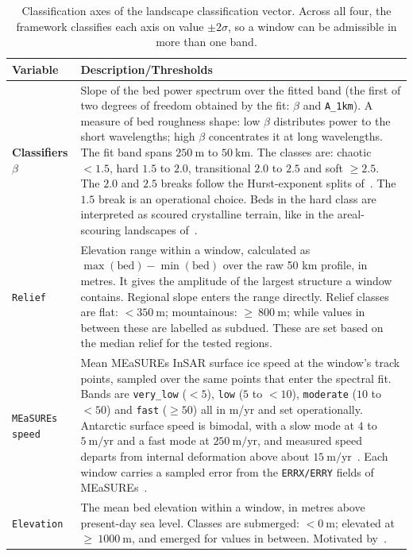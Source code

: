 \begin{table}[H]
\centering
\caption{Classification axes of the landscape classification vector. Across all four, the framework classifies each axis on value $\pm2\sigma$, so a window can be admissible in more than one band.}
\label{tab:axes}
\begin{tabularx}{\textwidth}{p{4.0cm} X}
\toprule
\textbf{Variable} & \textbf{Description/Thresholds} \\
\midrule
\textbf{Classifiers} 
  $\beta$ & Slope of the bed power spectrum over the fitted band (the first of two degrees of freedom obtained by the fit: $\beta$ and \texttt{A\_1km}). A measure of bed roughness shape: low $\beta$ distributes power to the short wavelengths; high $\beta$ concentrates it at long wavelengths. The fit band spans $250~\mathrm{m}$ to $50~\mathrm{km}$. The classes are: chaotic $< 1.5$, hard $1.5$ to $2.0$, transitional $2.0$ to $2.5$ and soft $\geq2.5$. The $2.0$ and $2.5$ breaks follow the Hurst-exponent splits of~\cite{Jordan_2017}. The $1.5$ break is an operational choice. Beds in the hard class are interpreted as scoured crystalline terrain, like in the areal-scouring landscapes of~\cite{Sugden_1978}. \\
  \addlinespace[0.5em]
  \texttt{Relief} & Elevation range within a window, calculated as $\max\mathrm{(bed)} - \min\mathrm{(bed)}$ over the raw 50 km profile, in metres. It gives the amplitude of the largest structure a window contains. Regional slope enters the range directly. Relief classes are flat: $<350~\mathrm{m}$; mountainous: $\geq~800~\mathrm{m}$; while values in between these are labelled as subdued. These are set based on the median relief for the tested regions.\\
  \addlinespace[0.5em]
  \texttt{MEaSUREs speed} & Mean MEaSUREs InSAR surface ice speed at the window's track points, sampled over the same points that enter the spectral fit. Bands are \texttt{very\_low} ($<5$), \texttt{low} ($5$ to $<10$), \texttt{moderate} ($10$ to $<50$) and \texttt{fast} ($\geq50$) all in m/yr and set operationally. Antarctic surface speed is bimodal, with a slow
  mode at $4$ to $5~\mathrm{m/yr}$ and a fast mode at $250~\mathrm{m/yr}$, and measured speed departs from internal deformation above about $15~\mathrm{m/yr}$~\cite{Rignot_2011}. Each window carries a sampled error from the \texttt{ERRX/ERRY} fields of MEaSUREs~\cite{Rignot_2017}.\\
  \addlinespace[0.5em]
  \texttt{Elevation} & The mean bed elevation within a window, in metres above present-day sea level. Classes are submerged: $<0~\mathrm{m}$; elevated at $\geq~1000~\mathrm{m}$, and emerged for values in between. Motivated by~\cite{Siegert_2004, Rippin_2014, Frederick_2016}. \\
\bottomrule
\end{tabularx}
\end{table}

